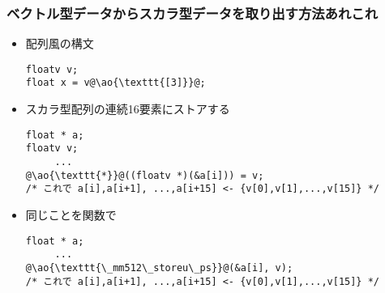 \documentclass[10pt,dvipdfmx]{beamer}
\newcommand{\ao}[1]{{\color{blue}#1}}
\begin{document}
\iffalse
\begin{frame}[fragile]
\frametitle{ベクトル型データからスカラ型データを取り出す方法あれこれ}
\begin{itemize}
\item 配列風の構文
\begin{lstlisting}
floatv v;
float x = v@\ao{\texttt{[3]}}@;
\end{lstlisting}

\item スカラ型配列の連続8要素にストアする
\begin{lstlisting}
float * a;
floatv v;
     ...
@\ao{\texttt{*}}@((floatv *)(&a[i])) = v;
/* これで a[i],a[i+1], ...,a[i+7] <- {v[0],v[1],...,v[7]} */
\end{lstlisting}

\item 同じことを関数で
\begin{lstlisting}
float * a;
     ...
@\ao{\texttt{\_mm256\_store\_ps}}@(&a[i], v);
@\ao{\texttt{\_mm256\_storeu\_ps}}@(&a[i], v);
/* これで a[i],a[i+1], ...,a[i+7] <- {v[0],v[1],...,v[7]} */
\end{lstlisting}
\end{itemize}
\end{frame}
\fi

\begin{frame}[fragile]
\frametitle{ベクトル型データからスカラ型データを取り出す方法あれこれ}
\begin{itemize}
\item 配列風の構文
\begin{lstlisting}
floatv v;
float x = v@\ao{\texttt{[3]}}@;
\end{lstlisting}

\item スカラ型配列の連続16要素にストアする
\begin{lstlisting}
float * a;
floatv v;
     ...
@\ao{\texttt{*}}@((floatv *)(&a[i])) = v;
/* これで a[i],a[i+1], ...,a[i+15] <- {v[0],v[1],...,v[15]} */
\end{lstlisting}

\item 同じことを関数で
\begin{lstlisting}
float * a;
     ...
@\ao{\texttt{\_mm512\_storeu\_ps}}@(&a[i], v);
/* これで a[i],a[i+1], ...,a[i+15] <- {v[0],v[1],...,v[15]} */
\end{lstlisting}
\end{itemize}
\end{frame}
\end{document}
